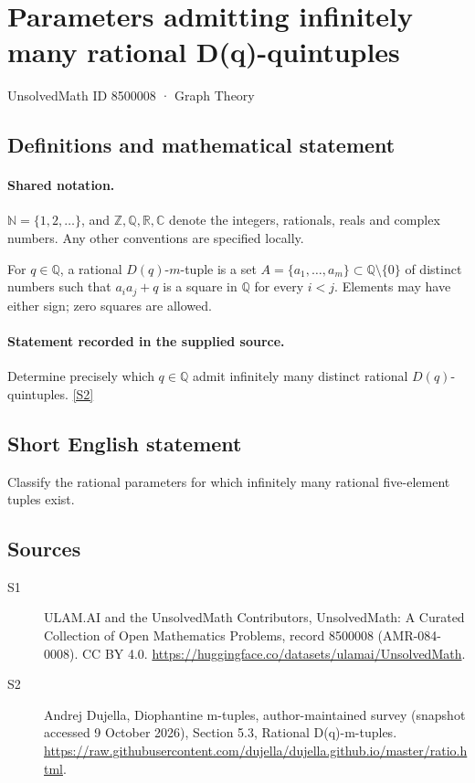 \documentclass[11pt]{article}
\newcommand{\sref}[2]{\hyperlink{source:#1:#2}{[S#2]}}
\begin{document}
\setcounter{section}{8500007}
\section{Parameters admitting infinitely many rational D(q)-quintuples}\label{8500008}
{\small\sffamily UnsolvedMath ID 8500008 · Graph Theory}
\subsection{Definitions and mathematical statement}

\paragraph{Shared notation.}$\mathbb N=\{1,2,\ldots\}$, and $\mathbb Z,\mathbb Q,\mathbb R,\mathbb C$ denote the integers, rationals, reals and complex numbers. Any other conventions are specified locally.


For $q\in\mathbb Q$, a rational $D(q)$-$m$-tuple is a set $A=\{a_1,\ldots,a_m\}\subset\mathbb Q\setminus\{0\}$ of distinct numbers such that $a_i a_j+q$ is a square in $\mathbb Q$ for every $i<j$. Elements may have either sign; zero squares are allowed.
\paragraph{Statement recorded in the supplied source.}
Determine precisely which $q\in\mathbb Q$ admit infinitely many distinct rational $D(q)$-quintuples. \sref{8500008}{2}
\subsection{Short English statement}
Classify the rational parameters for which infinitely many rational five-element tuples exist.
\subsection{Sources}
\begin{description}
\item[\hypertarget{source:8500008:1}{S1}] ULAM.AI and the UnsolvedMath Contributors, UnsolvedMath: A Curated Collection of Open Mathematics Problems, record 8500008 (AMR-084-0008). CC BY 4.0. \url{https://huggingface.co/datasets/ulamai/UnsolvedMath}.
\item[\hypertarget{source:8500008:2}{S2}] Andrej Dujella, Diophantine m-tuples, author-maintained survey (snapshot accessed 9 October 2026), Section 5.3, Rational D(q)-m-tuples. \url{https://raw.githubusercontent.com/dujella/dujella.github.io/master/ratio.html}.
\end{description}
\label{end:8500008}
\end{document}

